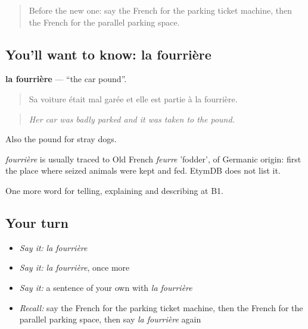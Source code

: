\label{lesson:FR-C407-fourriere}



\begin{quote}
Before the new one: say the French for the parking ticket machine, then the French for the parallel parking space.
\end{quote}

\subsection*{You'll want to know: la fourrière}
\textbf{la fourrière} — \textquotedblleft{}the car pound\textquotedblright{}.

\begin{quote}
Sa voiture était mal garée et elle est partie à la fourrière.
\end{quote}

\begin{quote}
\emph{Her car was badly parked and it was taken to the pound.}
\end{quote}

Also the pound for stray dogs.

\begin{cousinweb}
\emph{fourrière} is usually traced to Old French \emph{feurre} 'fodder', of Germanic origin: first the place where seized animals were kept and fed. EtymDB does not list it.
\end{cousinweb}

\begin{grammarlens}[title={What you've built}]
One more word for telling, explaining and describing at B1.
\end{grammarlens}

\subsection*{Your turn}
\begin{itemize}
\raggedright
  \item \emph{Say it:} \emph{la fourrière}
  \item \emph{Say it:} \emph{la fourrière}, once more
  \item \emph{Say it:} a sentence of your own with \emph{la fourrière}
  \item \emph{Recall:} say the French for the parking ticket machine, then the French for the parallel parking space, then say \emph{la fourrière} again
\end{itemize}

